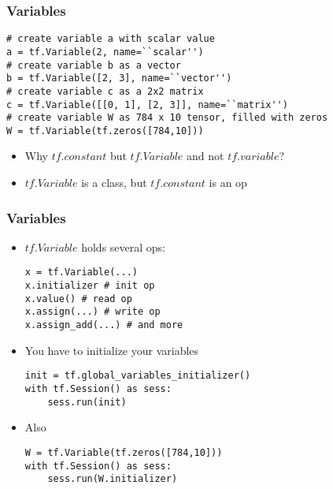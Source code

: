 \begin{frame}[fragile] \frametitle{Variables}

\begin{lstlisting}
# create variable a with scalar value
a = tf.Variable(2, name=``scalar'') 
# create variable b as a vector
b = tf.Variable([2, 3], name=``vector'') 
# create variable c as a 2x2 matrix
c = tf.Variable([[0, 1], [2, 3]], name=``matrix'') 
# create variable W as 784 x 10 tensor, filled with zeros
W = tf.Variable(tf.zeros([784,10]))
\end{lstlisting}
\begin{itemize}
\item Why $tf.constant$ but $tf.Variable$ and not $tf.variable$? 
\item \pause $tf.Variable$ is a class, but $tf.constant$ is an op

\end{itemize}

\end{frame}


\begin{frame}[fragile] \frametitle{Variables}
\begin{itemize}
\item $tf.Variable$ holds several ops:
\begin{lstlisting}
x = tf.Variable(...) 
x.initializer # init op
x.value() # read op
x.assign(...) # write op
x.assign_add(...) # and more
\end{lstlisting}
\item You have to initialize your variables
\begin{lstlisting}
init = tf.global_variables_initializer()
with tf.Session() as sess:
	sess.run(init)
\end{lstlisting}
\item Also
\begin{lstlisting}
W = tf.Variable(tf.zeros([784,10]))
with tf.Session() as sess:
    sess.run(W.initializer)
\end{lstlisting}
\end{itemize}

\end{frame}


